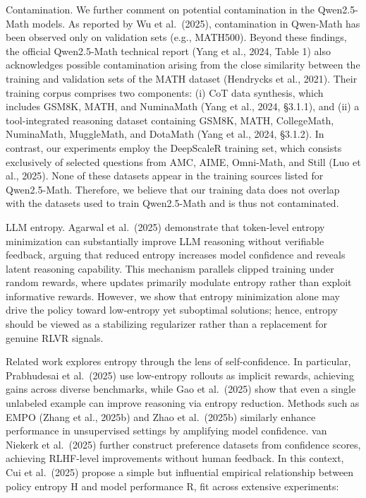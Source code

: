 \documentclass[
  10
]{article}
\begin{document}
Contamination. We further comment on potential contamination in the
Qwen2.5-Math models. As reported by Wu et al.~(2025), contamination in
Qwen-Math has been observed only on validation sets (e.g., MATH500).
Beyond these findings, the official Qwen2.5-Math technical report (Yang
et al., 2024, Table 1) also acknowledges possible contamination arising
from the close similarity between the training and validation sets of
the MATH dataset (Hendrycks et al., 2021). Their training corpus
comprises two components: (i) CoT data synthesis, which includes GSM8K,
MATH, and NuminaMath (Yang et al., 2024, §3.1.1), and (ii) a
tool-integrated reasoning dataset containing GSM8K, MATH, CollegeMath,
NuminaMath, MuggleMath, and DotaMath (Yang et al., 2024, §3.1.2). In
contrast, our experiments employ the DeepScaleR training set, which
consists exclusively of selected questions from AMC, AIME, Omni-Math,
and Still (Luo et al., 2025). None of these datasets appear in the
training sources listed for Qwen2.5-Math. Therefore, we believe that our
training data does not overlap with the datasets used to train
Qwen2.5-Math and is thus not contaminated.

LLM entropy. Agarwal et al.~(2025) demonstrate that token-level entropy
minimization can substantially improve LLM reasoning without verifiable
feedback, arguing that reduced entropy increases model confidence and
reveals latent reasoning capability. This mechanism parallels clipped
training under random rewards, where updates primarily modulate entropy
rather than exploit informative rewards. However, we show that entropy
minimization alone may drive the policy toward low-entropy yet
suboptimal solutions; hence, entropy should be viewed as a stabilizing
regularizer rather than a replacement for genuine RLVR signals.

Related work explores entropy through the lens of self-confidence. In
particular, Prabhudesai et al.~(2025) use low-entropy rollouts as
implicit rewards, achieving gains across diverse benchmarks, while Gao
et al.~(2025) show that even a single unlabeled example can improve
reasoning via entropy reduction. Methods such as EMPO (Zhang et al.,
2025b) and Zhao et al.~(2025b) similarly enhance performance in
unsupervised settings by amplifying model confidence. van Niekerk et
al.~(2025) further construct preference datasets from confidence scores,
achieving RLHF-level improvements without human feedback. In this
context, Cui et al.~(2025) propose a simple but influential empirical
relationship between policy entropy H and model performance R, fit
across extensive experiments:
\end{document}
